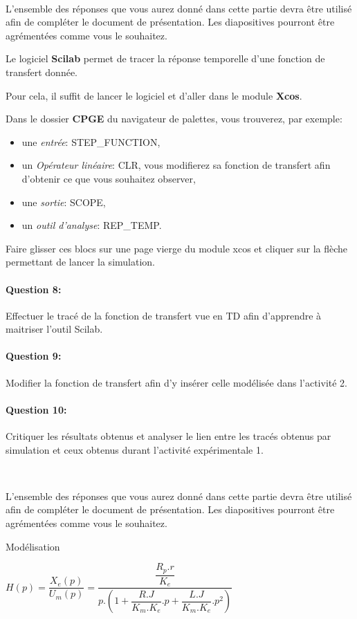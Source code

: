 ~\

L'ensemble des réponses que vous aurez donné dans cette partie devra être utilisé afin de compléter le document de présentation. Les diapositives pourront être agrémentées comme vous le souhaitez.

\ifdef{\public}{\cleardoublepage}{\newpage}


Le logiciel \textbf{Scilab} permet de tracer la réponse temporelle d'une fonction de transfert donnée.

Pour cela, il suffit de lancer le logiciel et d'aller dans le module \textbf{Xcos}.

Dans le dossier \textbf{CPGE} du navigateur de palettes, vous trouverez, par exemple:
\begin{itemize}
 \item une \textit{entrée}: STEP\_FUNCTION,
 \item un \textit{Opérateur linéaire}: CLR, vous modifierez sa fonction de transfert afin d'obtenir ce que vous souhaitez observer,
 \item une \textit{sortie}: SCOPE,
 \item un \textit{outil d'analyse}: REP\_TEMP.
\end{itemize}

Faire glisser ces blocs sur une page vierge du module xcos et cliquer sur la flèche permettant de lancer la simulation.

\paragraph{Question 8:} Effectuer le tracé de la fonction de transfert vue en TD afin d'apprendre à maitriser l'outil Scilab.

\paragraph{Question 9:} Modifier la fonction de transfert afin d'y insérer celle modélisée dans l'activité 2.

\paragraph{Question 10:} Critiquer les résultats obtenus et analyser le lien entre les tracés obtenus par simulation et ceux obtenus durant l'activité expérimentale 1.

~\

L'ensemble des réponses que vous aurez donné dans cette partie devra être utilisé afin de compléter le document de présentation. Les diapositives pourront être agrémentées comme vous le souhaitez.

\ifdef{\public}{}{}

\newpage

\pagestyle{correction}\setcounter{section}{0}

Modélisation
\begin{center}
$H(p)=\dfrac{X_e(p)}{U_m(p)}=\dfrac{\dfrac{R_p.r}{K_e}}{p.\left(1+\dfrac{R.J}{K_m.K_e}.p+\dfrac{L.J}{K_m.K_e}.p^2\right)}$
\end{center}

